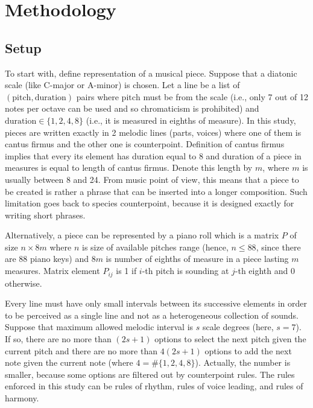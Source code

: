 \documentclass{article}
\begin{document}
\section{Methodology}
\label{sec:methodology}

\subsection{Setup}
\label{subsec:setup}

To start with, define representation of a musical piece. Suppose that a diatonic scale (like C-major or A-minor) is chosen. Let a line be a list of $(\mathrm{pitch}, \mathrm{duration})$ pairs where $\mathrm{pitch}$ must be from the scale (i.e., only 7 out of 12 notes per octave can be used and so chromaticism is prohibited) and $\mathrm{duration} \in \{1, 2, 4, 8\}$ (i.e., it is measured in eighths of measure). In this study, pieces are written exactly in 2 melodic lines (parts, voices) where one of them is cantus firmus and the other one is counterpoint. Definition of cantus firmus implies that every its element has duration equal to 8 and duration of a piece in measures is equal to length of cantus firmus. Denote this length by $m$, where $m$ is usually between 8 and 24. From music point of view, this means that a piece to be created is rather a phrase that can be inserted into a longer composition. Such limitation goes back to species counterpoint, because it is designed exactly for writing short phrases.

Alternatively, a piece can be represented by a piano roll which is a matrix $P$ of size $n \times 8m$ where $n$ is size of available pitches range (hence, $n \le 88$, since there are 88 piano keys) and $8m$ is number of eighths of measure in a piece lasting $m$ measures. Matrix element $P_{ij}$ is 1 if $i$-th pitch is sounding at $j$-th eighth and 0 otherwise.

Every line must have only small intervals between its successive elements in order to be perceived as a single line and not as a heterogeneous collection of sounds. Suppose that maximum allowed melodic interval is $s$ scale degrees (here, $s = 7$). If so, there are no more than $(2s + 1)$ options to select the next pitch given the current pitch and there are no more than $4(2s + 1)$ options to add the next note given the current note (where $4 = \#\{1, 2, 4, 8\}$). Actually, the number is smaller, because some options are filtered out by counterpoint rules. The rules enforced in this study can be rules of rhythm, rules of voice leading, and rules of harmony.
\end{document}
